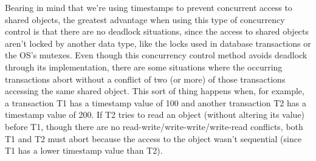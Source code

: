 \documentclass[times, 10pt,twocolumn]{article}
\begin{document}




Bearing in mind that we're using timestamps to prevent concurrent access to shared objects, the greatest advantage when using this type of concurrency control is that there are no deadlock situations, since the access to shared objects aren't locked by another data type, like the locks used in database transactions or the OS's mutexes. Even though this concurrency control method avoids deadlock through its implementation, there are some situations where the occurring transactions abort without a conflict of two (or more) of those transactions accessing the same shared object. This sort of thing happens when, for example, a transaction T1 has a timestamp value of 100 and another transaction T2 has a timestamp value of 200. If T2 tries to read an object (without altering its value) before T1, though there are no read-write/write-write/write-read conflicts, both T1 and T2 must abort because the access to the object wasn't sequential (since T1 has a lower timestamp value than T2).



\nocite{ex1,ex2}


\end{document}
